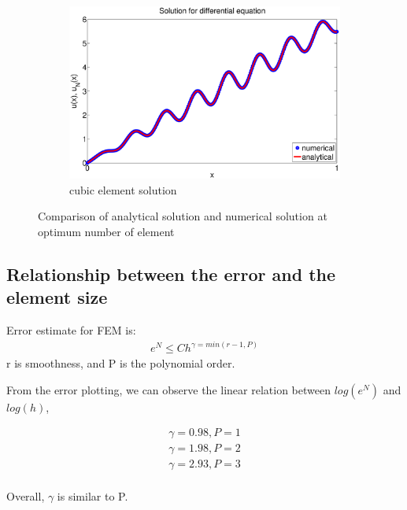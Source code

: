 \documentclass[paper=a4, fontsize=11pt]{article} %
\begin{document}
\begin{figure}
        \begin{subfigure}[b]{\textwidth}
                \includegraphics[width=\textwidth]{solution_P3.eps}
                \caption{cubic element solution}
                \label{fig:k8}
        \end{subfigure}

        \caption{Comparison of analytical solution and numerical solution at optimum number of element}\label{fig:solution}
\end{figure}

\subsection{Relationship between the error and the element size}
Error estimate for FEM is:
\begin{eqnarray}
e^N \leq Ch^{\gamma = min (r-1, P)}
\end{eqnarray}
r is smoothness, and P is the polynomial order.

From the error plotting, we can observe the linear relation between $log(e^N)$ and $log(h)$, 

\begin{eqnarray}
\gamma = 0.98, P=1\nonumber\\
\gamma = 1.98, P=2\nonumber\\
\gamma = 2.93, P=3\nonumber\\
\end{eqnarray}

Overall, $\gamma$ is similar  to P. 
\end{document}

